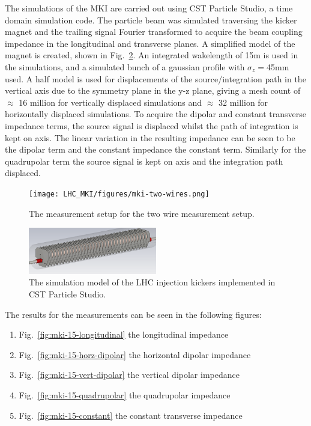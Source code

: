 The simulations of the MKI are carried out using CST Particle Studio, a time domain simulation code. The particle beam was simulated traversing the kicker magnet and the trailing signal Fourier transformed to acquire the beam coupling impedance in the longitudinal and transverse planes. A simplified model of the magnet is created, shown in Fig.~\ref{fig:mki-simulation-model}. An integrated wakelength of 15m is used in the simulations, and a simulated bunch of a gaussian profile with $\sigma_{z}=$45mm used. A half model is used for displacements of the source/integration path in the vertical axis due to the symmetry plane in the y-z plane, giving a mesh count of $\approx$ 16 million for vertically displaced simulations and $\approx$ 32 million for horizontally displaced simulations. To acquire the dipolar and constant transverse impedance terms, the source signal is displaced whilst the path of integration is kept on axis. The linear variation in the resulting impedance can be seen to be the dipolar term and the constant impedance the constant term. Similarly for the quadrupolar term the source signal is kept on axis and the integration path displaced.

\begin{figure}
\begin{center}
\texttt{[image: LHC\_MKI/figures/mki-two-wires.png]}
\end{center}
\caption{The measurement setup for the two wire measurement setup.}
\label{fig:mki-meas-two-wire}
\end{figure}

\begin{figure}
\begin{center}
\includegraphics[width=0.5\textwidth]{LHC_MKI/figures/simulation-model-mki-15.png}
\end{center}
\caption{The simulation model of the LHC injection kickers implemented in CST Particle Studio.}
\label{fig:mki-simulation-model}
\end{figure}


The results for the measurements can be seen in the following figures:
\begin{enumerate}
\item{Fig.~\ref{fig:mki-15-longitudinal} the longitudinal impedance}
\item{Fig.~\ref{fig:mki-15-horz-dipolar} the horizontal dipolar impedance}
\item{Fig.~\ref{fig:mki-15-vert-dipolar} the vertical dipolar impedance}
\item{Fig.~\ref{fig:mki-15-quadrupolar} the quadrupolar impedance}
\item{Fig.~\ref{fig:mki-15-constant} the constant transverse impedance}
\end{enumerate}

